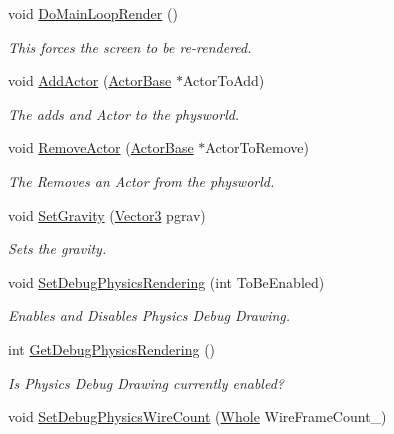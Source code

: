 \begin{DoxyCompactItemize}
void \hyperlink{classphys_1_1World_a34133dd084f575a51209458dbe9ecdac}{DoMainLoopRender} ()
\begin{DoxyCompactList}\small\item\em This forces the screen to be re-\/rendered. \item\end{DoxyCompactList}\item 
void \hyperlink{classphys_1_1World_a0fec41ef68b7bb1443aab927f8277a81}{AddActor} (\hyperlink{classphys_1_1ActorBase}{ActorBase} $\ast$ActorToAdd)
\begin{DoxyCompactList}\small\item\em The adds and Actor to the physworld. \item\end{DoxyCompactList}\item 
void \hyperlink{classphys_1_1World_ab00f84983afcc7f6ef1e5a84367d994d}{RemoveActor} (\hyperlink{classphys_1_1ActorBase}{ActorBase} $\ast$ActorToRemove)
\begin{DoxyCompactList}\small\item\em The Removes an Actor from the physworld. \item\end{DoxyCompactList}\item 
void \hyperlink{classphys_1_1World_a47e1221b296ea7c3188da65ca9570bd5}{SetGravity} (\hyperlink{classphys_1_1Vector3}{Vector3} pgrav)
\begin{DoxyCompactList}\small\item\em Sets the gravity. \item\end{DoxyCompactList}\item 
void \hyperlink{classphys_1_1World_a9fbd112d2677aa948301287d541b64bb}{SetDebugPhysicsRendering} (int ToBeEnabled)
\begin{DoxyCompactList}\small\item\em Enables and Disables Physics Debug Drawing. \item\end{DoxyCompactList}\item 
int \hyperlink{classphys_1_1World_a92070d16eb81866b4393f0ed96fbcbbc}{GetDebugPhysicsRendering} ()
\begin{DoxyCompactList}\small\item\em Is Physics Debug Drawing currently enabled? \item\end{DoxyCompactList}\item 
void \hyperlink{classphys_1_1World_a6fa4d1e58a78ba0403af1c003fd321d9}{SetDebugPhysicsWireCount} (\hyperlink{namespacephys_a460f6bc24c8dd347b05e0366ae34f34a}{Whole} WireFrameCount\_\-)

\end{DoxyCompactItemize}
